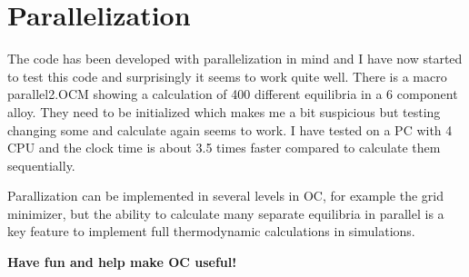 \documentclass[12pt]{article}
\begin{document}
\section{Parallelization}

The code has been developed with parallelization in mind and I have
now started to test this code and surprisingly it seems to work quite
well.  There is a macro parallel2.OCM showing a calculation of 400
different equilibria in a 6 component alloy.  They need to be
initialized which makes me a bit suspicious but testing changing some
and calculate again seems to work.  I have tested on a PC with 4 CPU
and the clock time is about 3.5 times faster compared to calculate
them sequentially.

Parallization can be implemented in several levels in OC, for example
the grid minimizer, but the ability to calculate many separate
equilibria in parallel is a key feature to implement full
thermodynamic calculations in simulations.

\bigskip

{\large \bf Have fun and help make OC useful!}
\end{document}
